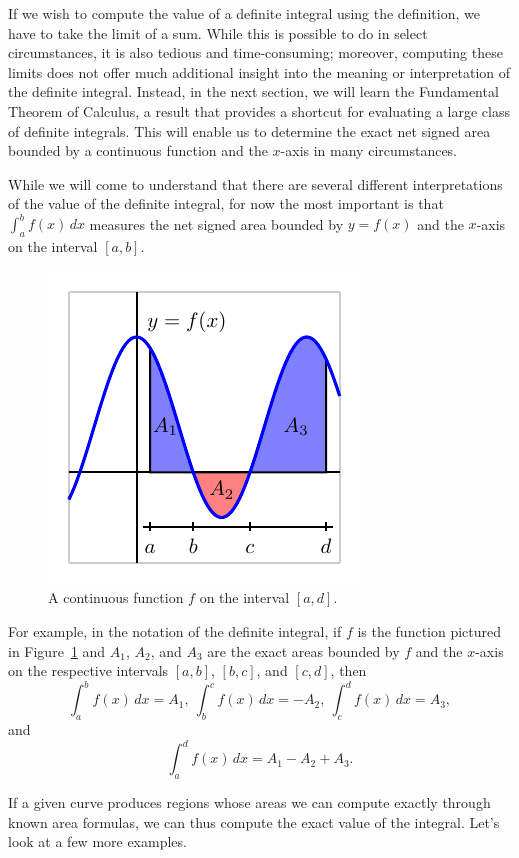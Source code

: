 If we wish to compute the value of a definite integral using the definition, we have to take the limit of a sum.  While this is possible to do in select circumstances, it is also tedious and time-consuming; moreover, computing these limits does not offer much additional insight into the meaning or interpretation of the definite integral.  Instead, in the next section, we will learn the Fundamental Theorem of Calculus, a result that provides a shortcut for evaluating a large class of definite integrals.  This will enable us to determine the exact net signed area bounded by a continuous function and the $x$-axis in many circumstances.

While we will come to understand that there are several different interpretations of the value of the definite integral, for now the most important is that $\int_a^b f(x) \, dx$ measures the net signed area bounded by $y = f(x)$ and the $x$-axis on the interval $[a,b]$. 

\begin{figure}[h]
\begin{center}
\includegraphics{figures/4_3_DefIntInterp}
\caption{A continuous function $f$ on the interval $[a,d]$.} \label{F:4.3.DefIntInterp}
\end{center}
\end{figure}
For example, in the notation of the definite integral, if $f$ is the function pictured in Figure~\ref{F:4.3.DefIntInterp} and $A_1$, $A_2$, and $A_3$ are the exact areas bounded by $f$ and the $x$-axis on the respective intervals $[a,b]$, $[b,c]$, and $[c,d]$, then
$$\int_a^b f(x) \, dx = A_1, \ \int_b^c f(x) \, dx = -A_2, \ \int_c^d f(x) \, dx = A_3,$$
and
$$\int_a^d f(x) \, dx = A_1 - A_2 + A_3.$$


If a given curve produces regions whose areas we can compute exactly through known area formulas, we can thus compute the exact value of the integral.  Let's look at a few more examples.



